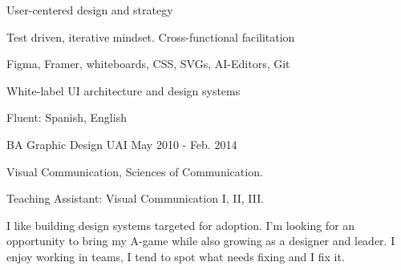 \noindent
\setlength{\cvquadrantColWidth}{0.5\textwidth}%
\addtolength{\cvquadrantColWidth}{-0.5\cvquadrantGap}%

\begin{minipage}[t]{\cvquadrantColWidth}
  \raggedright
  \vspace{2mm}
  \par
  \begin{cvitems}
    \item User-centered design and strategy
    \item Test driven, iterative mindset. Cross-functional facilitation
    \item Figma, Framer, whiteboards, CSS, SVGs, AI-Editors, Git
    \item White-label UI architecture and design systems
    \item Fluent: Spanish, English
  \end{cvitems}
\end{minipage}%
\hspace{\cvquadrantGap}%
\begin{minipage}[t]{\cvquadrantColWidth}
  \raggedright
  \vspace{2mm}
  \par
  \vspace{1.85mm}
  \begin{cventries}
    \cventry
      {BA Graphic Design}
      {UAI}
      {}
      {May 2010 - Feb. 2014}
      {
        \begin{cvitems}
          \item {Visual Communication, Sciences of Communication.}
          \item {Teaching Assistant: Visual Communication I, II, III.}
        \end{cvitems}
      }
  \end{cventries}
\end{minipage}%

\par%
\noindent
\begin{minipage}[t]{\textwidth}
  \raggedright
  \vspace{4mm}
  \par
  {\paragraphstyle I like building design systems targeted for adoption. I'm looking for an opportunity to bring my A-game while also growing as a designer and leader. I enjoy working in teams, I tend to spot what needs fixing and I fix it.\par}%
\end{minipage}%



